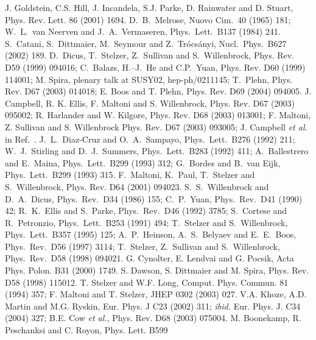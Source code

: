 \begin{thebibliography}{999}
%
 J. Goldstein, C.S. Hill, J. Incandela, S.J. Parke, 
D. Rainwater and D. Stuart, Phys. Rev. Lett. 86 (2001) 1694. 
%
 D.~B.~Melrose, Nuovo Cim.\  40 (1965) 181; 
W.~L.~van Neerven and J.~A.~Vermaseren, Phys.\ Lett.\ B137 (1984) 241.
%
 S.~Catani, S.~Dittmaier, M.~Seymour and 
Z.~Tr\'ocs\'anyi, Nucl.\, Phys.\, B627 (2002) 189. 
%
D.~Dicus, T.~Stelzer, Z.~Sullivan and S.~Willenbrock, Phys. Rev. D59 (1999) 
094016; C.~Balazs, H.--J.~He and C.P.~Yuan, Phys. Rev. D60 (1999) 114001;
M. Spira, plenary talk at SUSY02, hep-ph/0211145;
T.~Plehn, Phys. Rev. D67 (2003) 014018;  
E. Boos and T. Plehn, Phys. Rev. D69 (2004) 094005.  
%
 J. Campbell, R. K. Ellis, F. Maltoni and S. 
Willenbrock, Phys. Rev. D67 (2003) 095002; R. Harlander and W. Kilgore, Phys. 
Rev. D68 (2003) 013001; F. Maltoni, Z. Sullivan and S. Willenbrock Phys. Rev. 
D67 (2003) 093005; J. Campbell {\it et al.} in Ref.~\cite{Houches2003}.
%
J.~L.~Diaz-Cruz and O.~A.~Sampayo, Phys.\ Lett.\ B276 (1992) 211; 
W.~J.~Stirling and D.~J.~Summers, Phys.\ Lett.\ B283 (1992) 411; 
A.~Ballestrero and E.~Maina, Phys.\ Lett.\ B299 (1993) 312; 
G.~Bordes and B.~van Eijk, Phys.\ Lett.\ B299 (1993) 315. 
%
 F.~Maltoni, K.~Paul, T.~Stelzer and S.~Willenbrock, 
Phys. Rev. D64 (2001) 094023.
%
S.~S.~Willenbrock and D.~A.~Dicus, Phys.\ Rev.\ D34 (1986)  155; 
C.~P.~Yuan, Phys.\ Rev.\ D41 (1990) 42; 
R.~K.~Ellis and S.~Parke, Phys.\ Rev.\ D46 (1992) 3785; 
S.~Cortese and R.~Petronzio, Phys.\ Lett.\ B253 (1991) 494; 
T.~Stelzer and S.~Willenbrock, Phys.\ Lett.\ B357 (1995) 125; 
A.~P.~Heinson, A.~S.~Belyaev and E.~E.~Boos, Phys.\ Rev.\ D56 (1997) 3114;
T.~Stelzer, Z.~Sullivan and S.~Willenbrock, Phys.\ Rev.\ D58 (1998) 094021.
%
 G. Cynolter, E. Lendvai and G. Pocsik, 
Acta Phys. Polon. B31 (2000) 1749. 
%
S. Dawson, S. Dittmaier and M. Spira, Phys. Rev. D58 (1998) 115012.
%
T. Stelzer and W.F. Long, Comput. Phys. Commun. 81 (1994) 357;
F. Maltoni and T. Stelzer, JHEP 0302 (2003) 027. 
%
V.A. Khoze, A.D. Martin and M.G. Ryskin, Eur. Phys. J C23 (2002) 311; 
{\it ibid.} Eur. Phys. J. C34 (2004) 327; B.E. Cow {\it et al.}, Phys. Rev. D68 (2003) 075004.
%
 M. Boonekamp, R. Peschanksi and C. Royon, Phys. Lett. B599 

\end{thebibliography}
